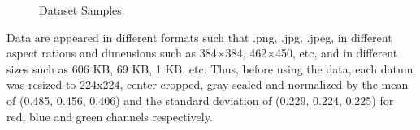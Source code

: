 \begin{figure}[h]
	\centering
	\caption{Dataset Samples.}
	\label{dataset_samples}
\end{figure}

Data are appeared in different formats such that .png, .jpg, .jpeg, in different aspect rations and dimensions such as 384×384, 462×450, etc, and in different sizes such as 606 KB, 69 KB, 1 KB, etc. Thus, before using the data, each datum was resized to 224x224, center cropped, gray scaled and normalized by the mean of (0.485, 0.456, 0.406) and the standard deviation of (0.229, 0.224, 0.225) for red, blue and green channels respectively.

